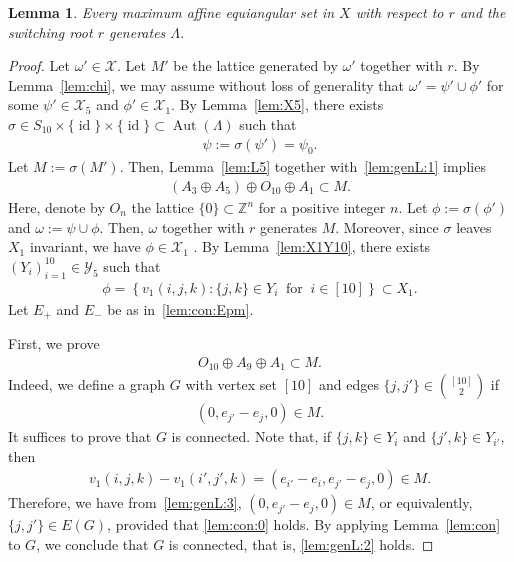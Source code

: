 \documentclass[reqno, 11pt]{amsart}
\numberwithin{equation}{section}
\newtheorem{lem}{Lemma}[section]
\theoremstyle{definition}
\DeclareMathOperator{\Aut}{Aut}
\DeclareMathOperator{\id}{id}
\newcommand{\cY}{\mathcal{Y}}
\newcommand{\aes}{\omega}
\newcommand{\aeso}{\phi}
\newcommand{\aesf}{\psi}
\newcommand{\cX}{\mathcal{X}}
\newcommand{\Z}{\mathbb{Z}}
\newcommand{\sr}{ r } %
\begin{document}
\begin{lem}	\label{lem:genL}
	Every maximum affine equiangular set in $X$ with respect to $\sr$ and the switching root $\sr$ generates $\Lambda$.
\end{lem}
\begin{proof}
	Let $\aes' \in \cX$.
	Let $M'$ be the lattice generated by $\aes'$ together with $r$.
	By Lemma~\ref{lem:chi}, we may assume without loss of generality that
	$\aes' = \aesf' \cup \aeso'$ for some
	$\aesf' \in \cX_5$ and $\aeso' \in \cX_1$.
	By Lemma~\ref{lem:X5}, there exists $\sigma \in S_{10}\times\{\id \}\times\{ \id \}\subset
		\Aut(\Lambda)$ such that
	\begin{align}	\label{lem:genL:1}
		\aesf := \sigma(\aesf') = \psi_0.
	\end{align}
	Let $M:=\sigma(M')$. Then,
	Lemma~\ref{lem:L5} together with~\eqref{lem:genL:1} implies
	\begin{align} \label{lem:genL:3}
		(A_3 \oplus A_5 ) \oplus O_{10} \oplus A_1  \subset M.
	\end{align}
	Here, denote by $O_n$ the lattice $\{ 0 \} \subset \Z^n$ for a positive integer $n$.
	Let $\aeso := \sigma(\aeso')$ and $\aes:=\aesf\cup\aeso$.
	Then, $\aes$ together with $r$ generates $M$.
	Moreover, since $\sigma$ leaves $X_1$ invariant, we have $\aeso \in \cX_1$ .
	By Lemma~\ref{lem:X1Y10}, there exists $(Y_i)_{i=1}^{10} \in \cY_{5}$ such that
	\begin{align} \label{lem:genL:4}
		\aeso = \left\{ v_1(i,j,k) : \{j,k\} \in Y_i \ \text{ for }\  i \in [10] \right\} \subset X_1.
	\end{align}
	Let $E_+$ and $E_-$ be as in~\eqref{lem:con:Epm}.

	First, we prove
	\begin{align} \label{lem:genL:2}
		O_{10} \oplus A_9 \oplus A_1 \subset M.
	\end{align}
	Indeed, we define a graph $G$ with vertex set $[10]$ and edges $\{j, j'\} \in \binom{[10]}{2}$ if
	\begin{align}	\label{lem:genL:6}
		(0,e_{j'}-e_j,0) \in M.
	\end{align}
	It suffices to prove that $G$ is connected.
	Note that, if $\{j,k\}\in Y_i$ and $\{j',k\}\in Y_{i'}$, then
	\begin{align}	\label{lem:genL:5}
		v_1(i,j,k)-v_1(i',j',k) = (e_{i'}-e_i, e_{j'}-e_j , 0) \in M.
	\end{align}
	Therefore, we have from~\eqref{lem:genL:3},
	$(0,e_{j'}-e_j,0) \in M$, or equivalently, $\{j,j'\} \in E(G)$,
	provided that \eqref{lem:con:0} holds.
	By applying Lemma~\ref{lem:con} to $G$, we conclude that $G$ is connected, that is, \eqref{lem:genL:2} holds.


\end{proof}
\end{document}
